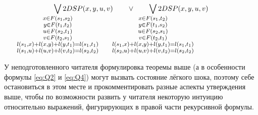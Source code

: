 \begin{theorem}
\begin{enumerate}
\begin{align}
        \smashoperator{\bigvee_{
        \large \substack{
            x \in F(s_1, s_2)\\ 
            y \in F(t_1, t_2)\\ 
            u \in F(s_2, t_1)\\ 
            v \in F(t_2, s_1)\\ 
            l(s_1, x) + l(x, y) + l(y, t_1) = l(s_1, t_1)\\ 
            l(s_1, u) + l(u, v) + l(v, t_2) = l(s_2, t_2)
        }
        }} 2DSP(x, y, u, v)
        \quad\quad\vee\quad\quad
        \smashoperator{\bigvee_{
        \large \substack{
            x \in F(s_1, t_2)\\ 
            y \in F(t_1, s_2)\\ 
            u \in F(s_2, s_1)\\ 
            v \in F(t_2, t_1)\\ 
            l(s_1, x) + l(x, y) + l(y, t_1) = l(s_1, t_1)\\ 
            l(s_2, u) + l(u, v) + l(v, t_2) = l(s_2, t_2)
        }
        }} 2DSP(x, y, u, v) \label{eq:Q4} \\
\end{align}
\end{enumerate}
\end{theorem}

У неподготовленного читателя формулировка теоремы выше (а в особенности формулы \eqref{eq:Q2} и \eqref{eq:Q4}) могут вызвать состояние лёгкого шока, поэтому себе остановиться в этом месте и прокомментировать разные аспекты утверждения выше, чтобы по возможности развить у читателя некоторую интуицию относительно выражений, фигурирующих в правой части рекурсивной формулы.

